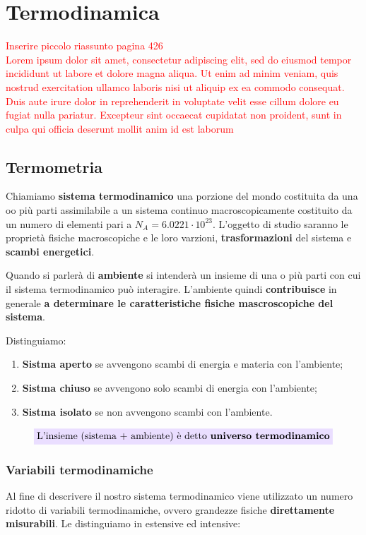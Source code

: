 \documentclass[x11names]{report}
\newcommand{\viola}[1]{\colorbox{yred}{$\displaystyle #1$}}
\begin{document}
	
	
	
\newpage
\chapter{Termodinamica}
\textcolor{red}{Inserire piccolo riassunto pagina 426}\\

\textcolor{red}{Lorem ipsum dolor sit amet, consectetur adipiscing elit, sed do eiusmod tempor incididunt ut labore et dolore magna aliqua. Ut enim ad minim veniam, quis nostrud exercitation ullamco laboris nisi ut aliquip ex ea commodo consequat. Duis aute irure dolor in reprehenderit in voluptate velit esse cillum dolore eu fugiat nulla pariatur. Excepteur sint occaecat cupidatat non proident, sunt in culpa qui officia deserunt mollit anim id est laborum}


\section{Termometria}
Chiamiamo \textbf{sistema termodinamico} una porzione del mondo costituita da una oo più parti assimilabile a un sistema continuo macroscopicamente costituito da un numero di elementi pari a \(N_A = 6.0221 \cdot 10^{23}\). L'oggetto di studio saranno le proprietà fisiche macroscopiche e le loro varzioni, \textbf{trasformazioni} del sistema e \textbf{scambi energetici}.

Quando si parlerà di \textbf{ambiente} si intenderà un insieme di una o più parti con cui il sistema termodinamico può interagire. L'ambiente quindi \textbf{contribuisce} in generale \textbf{a determinare le caratteristiche fisiche mascroscopiche del sistema}.

Distinguiamo:
\begin{enumerate}
	\item \textbf{Sistma aperto} se avvengono scambi di energia e materia con l'ambiente;
	\item \textbf{Sistma chiuso} se avvengono solo scambi di energia con l'ambiente;
	\item \textbf{Sistma isolato} se non avvengono scambi con l'ambiente.
\end{enumerate}

\[ 
\viola{\text{{L'insieme (sistema + ambiente) è detto \textbf{universo termodinamico}}}}
\]
\subsection{Variabili termodinamiche}
Al fine di descrivere il nostro sistema termodinamico viene utilizzato un numero ridotto di variabili termodinamiche, ovvero grandezze fisiche \textbf{direttamente misurabili}. Le distinguiamo in estensive ed intensive:
\end{document}
